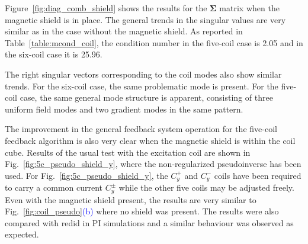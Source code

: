 Figure~\ref{fig:diag_comb_shield} shows the results for the
$\bm{\Sigma}$ matrix when the magnetic shield is in place.  The
general trends in the singular values are very similar as in the case
without the magnetic shield.  As reported in
Table~\ref{table:mcond_coil}, the condition number in the five-coil
case is 2.05 and in the six-coil case it is 25.96.


The right singular vectors corresponding to the coil modes also show
similar trends.  For the six-coil case, the same problematic mode is
present.  For the five-coil case, the same general mode structure is
apparent, consisting of three uniform field modes and two gradient
modes in the same pattern.


 


The improvement in the general feedback system operation for the
five-coil feedback algorithm is also very clear when the magnetic
shield is within the coil cube.  Results of the usual test with the
excitation coil are shown in Fig.~\ref{fig:5c_pseudo_shield_y}, where
the non-regularized pseudoinverse has been used.  For
Fig.~\ref{fig:5c_pseudo_shield_y}, the $C_y^+$ and $C_y^-$ coils have
been required to carry a common current $C_y^\pm$ while the other five
coils may be adjusted freely.  Even with the magnetic shield present,
the results are very similar to Fig.~\ref{fig:coil_pseudo}\textcolor{blue}{(b)} where no
shield was present. The results were also compared with redid in PI simulations and a similar behaviour was observed as expected.


